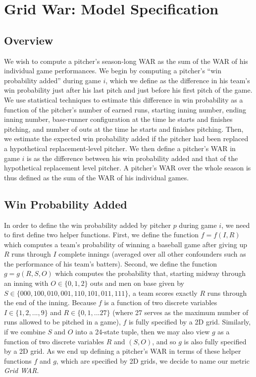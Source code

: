 \documentclass[12pt]{article}
\begin{document}
\section{Grid War: Model Specification}

\subsection{Overview}

We wish to compute a pitcher's season-long WAR as the sum of the WAR of his individual game performances. We begin by computing a pitcher's ``win probability added'' during game $i$, which we define as the difference in his team's win probability just after his last pitch and just before his first pitch of the game. We use statistical techniques to estimate this difference in win probability as a function of the pitcher's number of earned runs, starting inning number, ending inning number, base-runner configuration at the time he starts and finishes pitching, and number of outs at the time he starts and finishes pitching. Then, we estimate the expected win probability added if the pitcher had been replaced a hypothetical replacement-level pitcher. We then define a pitcher's WAR in game $i$ is as the difference between his win probability added and that of the hypothetical replacement level pitcher. A pitcher's WAR over the whole season is thus defined as the sum of the WAR of his individual games.

\subsection{Win Probability Added}

In order to define the win probability added by pitcher $p$ during game $i$, we need to first define two helper functions. First, we define the function $f = f(I,R)$ which computes a team's probability of winning a baseball game after giving up $R$ runs through $I$ complete innings (averaged over all other confounders such as the performance of his team's batters). Second, we define the function $g = g(R,S,O)$ which computes the probability that, starting midway through an inning with $O \in \{0,1,2\}$ outs and men on base given by $S \in \{000,100,010,001,110,101,011,111\}$, a team scores exactly $R$ runs through the end of the inning. Because $f$ is a function of two discrete variables $I \in \{1,2,...,9\}$ and $R \in \{0,1,...27\}$ (where 27 serves as the maximum number of runs allowed to be pitched in a game), $f$ is fully specified by a 2D grid. Similarly, if we combine $S$ and $O$ into a 24-state tuple, then we may also view $g$ as a function of two discrete variables $R$ and $(S,O)$, and so $g$ is also fully specified by a 2D grid. As we end up defining a pitcher's WAR in terms of these helper functions $f$ and $g$, which are specified by 2D grids, we decide to name our metric \textit{Grid WAR}. 
\end{document}
